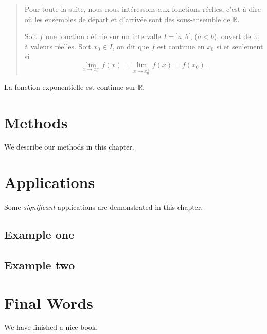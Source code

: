 \documentclass[]{book}
\theoremstyle{definition}
\theoremstyle{definition}
\theoremstyle{definition}
\theoremstyle{remark}
\let\BeginKnitrBlock\begin \let\EndKnitrBlock\end
\begin{document}
\begin{quote}
Pour toute la suite, nous nous intéressons aux fonctions réelles, c'est à dire où les ensembles de départ et d'arrivée sont des sous-ensemble de \(\mathbb R\).

\BeginKnitrBlock{definition}[Continuité]
\protect\hypertarget{def:unnamed-chunk-6}{}{\label{def:unnamed-chunk-6} \iffalse (Continuité) \fi{} }Soit \(f\) une fonction définie sur un intervalle \(I=]a,b[\), (\(a<b\)), ouvert de \(\mathbb R\), à valeurs réelles. Soit \(x_0\in I\), on dit que \(f\) est continue en \(x_0\) si et seulement si
\[
\lim_{x\rightarrow x_0^-}f(x)=\lim_{x\rightarrow x_0^+}f(x)=f(x_0).
\]
\EndKnitrBlock{definition}
\end{quote}

\BeginKnitrBlock{example}
\protect\hypertarget{exm:unnamed-chunk-7}{}{\label{exm:unnamed-chunk-7} }La fonction exponentielle est continue sur \(\mathbb R\).
\EndKnitrBlock{example}

\hypertarget{methods}{%
\chapter{Methods}\label{methods}}

We describe our methods in this chapter.

\hypertarget{applications}{%
\chapter{Applications}\label{applications}}

Some \emph{significant} applications are demonstrated in this chapter.

\hypertarget{example-one}{%
\section{Example one}\label{example-one}}

\hypertarget{example-two}{%
\section{Example two}\label{example-two}}

\hypertarget{final-words}{%
\chapter{Final Words}\label{final-words}}

We have finished a nice book.


\end{document}
